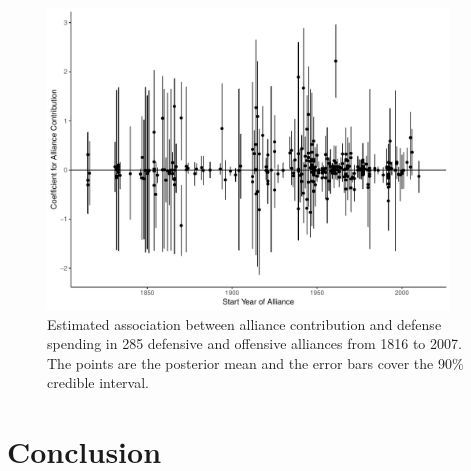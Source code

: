 \documentclass[12pt]{article}
\begin{document}
\begin{figure}[htbp]
	\centering
		\includegraphics[width=0.95\textwidth]{alliance-coefs-year.pdf}
	\caption{Estimated association between alliance contribution and defense spending in 285 defensive and offensive alliances from 1816 to 2007. The points are the posterior mean and the error bars cover the 90\% credible interval.}
	\label{fig:alliance-coefs-year}
\end{figure}



\section{Conclusion}


\singlespace


%  
 
\end{document}
